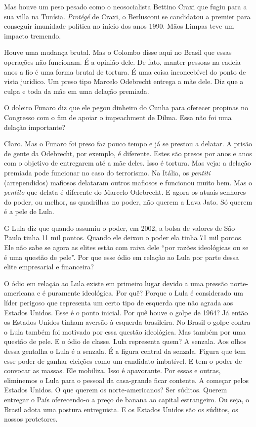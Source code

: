  Mas houve um peso pesado como o neosocialista Bettino Craxi que fugiu
para a sua villa na Tunísia. \emph{Protégé} de Craxi, o Berlusconi se
candidatou a premier para conseguir imunidade política no início dos
anos 1990. Mãos Limpas teve um impacto tremendo.

 Houve uma mudança brutal. Mas o Colombo disse aqui no Brasil que
essas operações não funcionam. É a opinião dele. De fato, manter pessoas
na cadeia anos a fio é uma forma brutal de tortura. É uma coisa
inconcebível do ponto de vista jurídico. Um preso tipo Marcelo Odebrecht
entrega a mãe dele. Diz que a culpa e toda da mãe em uma delação
premiada.

 O doleiro Funaro diz que ele pegou dinheiro do Cunha para oferecer
propinas no Congresso com o fim de apoiar o impeachment de Dilma. Essa
não foi uma delação importante?

 Claro. Mas o Funaro foi preso faz pouco tempo e já se prestou a
delatar. A prisão de gente da Odebrecht, por exemplo, é diferente. Estes
são presos por anos e anos com o objetivo de entregarem até a mãe deles.
Isso é tortura. Mas veja: a delação premiada pode funcionar no caso do
terrorismo. Na Itália, os \emph{pentiti} (arrependidos) mafiosos
delataram outros mafiosos e funcionou muito bem. Mas o \emph{pentito}
que delata é diferente do Marcelo Odebrecht. E agora os atuais senhores
do poder, ou melhor, as quadrilhas no poder, não querem a Lava Jato. Só
querem é a pele de Lula.

G Lula diz que quando assumiu o poder, em 2002, a bolsa de valores de
São Paulo tinha 11 mil pontos. Quando ele deixou o poder ela tinha 71
mil pontos. Ele não sabe se agora as elites estão com raiva dele ``por
razões ideológicas ou se é uma questão de pele''. Por que esse ódio em
relação ao Lula por parte dessa elite empresarial e financeira?

 O ódio em relação ao Lula existe em primeiro lugar devido a uma
pressão norte-americana e é puramente ideológica.
\protect\hypertarget{_Hlk498163994}{}{}Por quê? Porque o Lula é
considerado um líder perigoso que representa um certo tipo de esquerda
que não agrada aos Estados Unidos. Esse é o ponto inicial. Por quê houve
o golpe de 1964? Já então os Estados Unidos tinham aversão à esquerda
brasileira. No Brasil o golpe contra o Lula também foi motivado por essa
questão ideológica. Mas também por uma questão de pele. E o ódio de
classe. Lula representa quem? A senzala. Aos olhos dessa gentalha o Lula
é a senzala. É a figura central da senzala. Figura que tem esse poder de
ganhar eleições como um candidato imbatível. E tem o poder de convocar
as massas. Ele mobiliza. Isso é apavorante. Por essas e outras,
eliminemos o Lula para o pessoal da casa-grande ficar contente. A
começar pelos Estados Unidos. O que querem os norte-americanos? Ser
súditos. Querem entregar o País oferecendo-o a preço de banana ao
capital estrangeiro. Ou seja, o Brasil adota uma postura entreguista. E
os Estados Unidos são os súditos, os nossos protetores.

